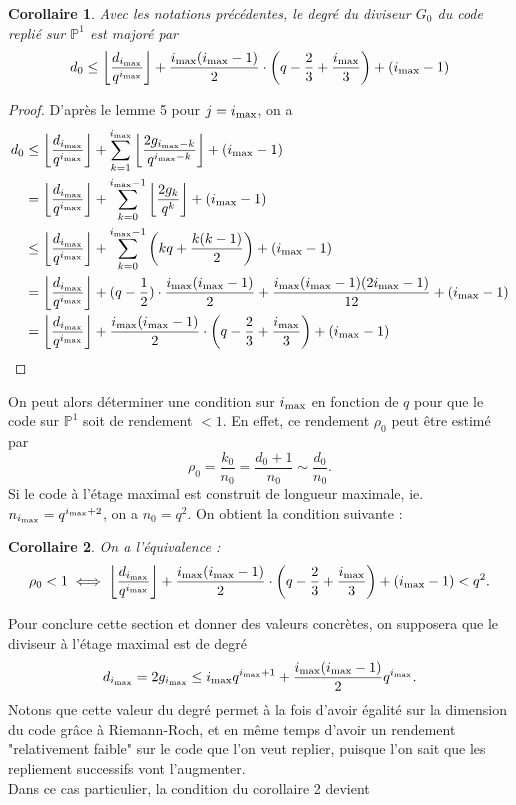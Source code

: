 \documentclass[10pt]{article}
\newtheorem{coro1}{Corollaire}[]
\newcommand{\cd}{\cdot}
\newcommand{\ii}{i_{\rm{max}}}
\begin{document}
\begin{coro1}
Avec les notations précédentes, le degré du diviseur $G_0$ du code replié sur $\mathbb{P}^1$ est majoré par 
\[d_0 \leq \left\lfloor \dfrac{d_{\ii}}{q^{\ii}}\right\rfloor + \dfrac{\ii(\ii-1)}{2}\cd \left(q-\frac{2}{3} + \frac{\ii}{3}\right) + (\ii-1)  \]
\end{coro1}

\begin{proof}
D'après le lemme 5 pour $j=\ii$, on a
\begin{align*}
d_0 &\leq \left\lfloor \dfrac{d_{\ii}}{q^{\ii}}\right\rfloor + \sum\limits_{k=1}^{\ii} \left\lfloor \dfrac{2g_{\ii -k}}{q^{\ii-k}}\right\rfloor + (\ii-1) \\
	&= \left\lfloor \dfrac{d_{\ii}}{q^{\ii}}\right\rfloor + \sum\limits_{k=0}^{\ii-1} \left\lfloor \dfrac{2g_k}{q^k}\right\rfloor + (\ii-1) \\
	& \leq \left\lfloor \dfrac{d_{\ii}}{q^{\ii}}\right\rfloor + \sum\limits_{k=0}^{\ii-1} \left(kq + \dfrac{k(k-1)}{2}\right) + (\ii-1) \\
	&= \left\lfloor \dfrac{d_{\ii}}{q^{\ii}}\right\rfloor + (q-\frac{1}{2}) \cd \dfrac{\ii(\ii-1)}{2} + \dfrac{\ii(\ii-1)(2\ii-1)}{12} + (\ii-1) \\
	&= \left\lfloor \dfrac{d_{\ii}}{q^{\ii}}\right\rfloor + \dfrac{\ii(\ii-1)}{2}\cd \left(q-\frac{2}{3} + \frac{\ii}{3}\right) + (\ii-1) \\
\end{align*}
\end{proof}

On peut alors déterminer une condition sur $\ii$ en fonction de $q$ pour que le code sur $\mathbb{P}^1$ soit de rendement $< 1$. En effet, ce rendement $\rho_0$ peut être estimé par 
\[ \rho_0 = \dfrac{k_0}{n_0} = \dfrac{d_0+1}{n_0} \sim \dfrac{d_0}{n_0}.\]
Si le code à l'étage maximal est construit de longueur maximale, ie. $n_{\ii} = q^{\ii+2}$, on a $n_0=q^2$. On obtient la condition suivante :

\begin{coro1}\label{cor:cdt_deg_herm}
On a l'équivalence :
\[ \rho_0 < 1 \iff \left\lfloor \dfrac{d_{\ii}}{q^{\ii}}\right\rfloor + \dfrac{\ii(\ii-1)}{2}\cd \left(q-\frac{2}{3} + \frac{\ii}{3}\right) + (\ii-1) < q^2.\]
\end{coro1}

Pour conclure cette section et donner des valeurs concrètes, on supposera que le diviseur à l'étage maximal est de degré 
\[d_{\ii} = 2g_{\ii} \leq \ii q^{\ii+1} + \dfrac{\ii(\ii-1)}{2}q^{\ii}.\]
Notons que cette valeur du degré permet à la fois d'avoir égalité sur la dimension du code grâce à Riemann-Roch, et en même temps d'avoir un rendement "relativement faible" sur le code que l'on veut replier, puisque l'on sait que les repliement successifs vont l'augmenter. \\
Dans ce cas particulier, la condition du corollaire 2 devient
\end{document}
